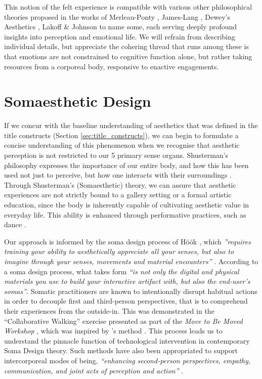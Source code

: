 This notion of the felt experience is compatible with various other philosophical theories proposed in the works of Merleau-Ponty \cite{merleau-ponty_phenomenology_2012}, James-Lang \cite{cannon_james-lange_1927}, Dewey's Aesthetics \cite{dewey_aesthetic_1950}, Lakoff \& Johnson \cite{lakoff_philosophy_1999} to name some, each serving deeply profound insights into perception and emotional life. We will refrain from describing individual details, but appreciate the cohering thread that runs among these is that emotions are not constrained to cognitive function alone, but rather taking resources from a corporeal body, responsive to enactive engagements.

\section{Somaesthetic Design}
\label{sec:somaesthetic_design}

If we concur with the baseline understanding of aesthetics that was defined in the title constructs (Section \ref{sec:title_constructs}), we can begin to formulate a concise understanding of this phenomenon when we recognise that aesthetic perception is not restricted to our 5 primary sense organs. Shusterman's philosophy expresses the importance of our entire body, and how this has been used not just to perceive, but how one interacts with their surroundings \cite{shusterman_body_2008}. Through Shusterman’s (Somaesthetic) theory, we can assure that aesthetic experiences are not strictly bound to a gallery setting or a formal artistic education, since the body is inherently capable of cultivating aesthetic value in everyday life. This ability is enhanced through performative practices, such as dance \cite{eric_c_mullis_performative_2006,shusterman_body_2012}.

Our approach is informed by the soma design process of Höök \cite{hook_designing_2018}, which \textit{''requires training your ability to aesthetically appreciate all your senses, but also to imagine through your senses, movements and material encounters''} \cite{hook_soma_2019}. According to a soma design process, what takes form \textit{``is not only the digital and physical materials you use to build your interactive artifact with, but also the end-user's somas''}. Somatic practitioners are known to intentionally disrupt habitual actions in order to decouple first and third-person perspectives, that is to comprehend their experiences from the outside-in. This was demonstrated in the ``Collaborative Walking'' exercise presented as part of the \textit{Move to Be Moved Workshop} \cite{hook_embracing_2018}, which was inspired by \citeauthor{loke_moving_2013}'s method \cite{loke_moving_2013}. This process leads us to understand the pinnacle function of technological intervention in contemporary Soma Design theory. Such methods have also been appropriated to support intercorporeal modes of being, \textit{``enhancing second-person perspectives, empathy, communication, and joint acts of perception and action''} \cite{turmo_vidal_designing_2021}.

